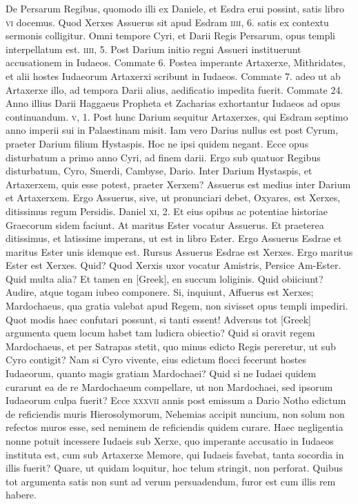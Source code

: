 De Persarum Regibus, quomodo illi ex Daniele,
 et Esdra erui possint,
satis libro \textsc{vi} docemus.
Quod Xerxes Assuerus sit apud Esdram
\textsc{iiii}, 6. satis ex contextu sermonis colligitur.
Omni tempore
Cyri, et Darii Regis Persarum, opus templi interpellatum est.
\textsc{iiii}, 5.
Post Darium initio regni Assueri instituerunt accusationem
in Iudaeos.
Commate 6.
Postea imperante Artaxerxe, Mithridates,
et alii hostes Iudaeorum Artaxerxi scribunt in Iudaeos.
Commate 7.
adeo ut ab Artaxerxe illo, ad tempora Darii alius, aedificatio impedita
fuerit.
Commate 24.
Anno illius Darii Haggaeus Propheta
et Zacharias exhortantur Iudaeos ad opus continuandum.
\textsc{v}, 1.
Post hunc Darium sequitur Artaxerxes, qui Esdram septimo anno
imperii sui in Palaestinam misit.
Iam vero Darius nullus est post Cyrum,
praeter Darium filium Hystaspis.
Hoc ne ipsi quidem negant.
Ecce opus disturbatum a primo anno Cyri, ad finem darii.
Ergo sub quatuor Regibus disturbatum, Cyro, Smerdi, Cambyse,
Dario.
Inter Darium Hystaspis, et Artaxerxem, quis esse potest,
praeter Xerxem?
Assuerus est medius inter Darium et Artaxerxem.
Ergo Assuerus, sive, ut pronunciari debet, Oxyares, est Xerxes, ditissimus
regum Persidis.
Daniel \textsc{xi}, 2.
Et eius opibus ac potentiae historiae
Graecorum sidem faciunt.
At maritus Ester vocatur Assuerus.
Et praeterea ditissimus, et latissime imperans, ut est in libro
Ester.
Ergo Assuerus Esdrae et maritus Ester unis idemque est.
Rursus Assuerus Esdrae est Xerxes.
Ergo maritus Ester est Xerxes.
Quid?
Quod Xerxis uxor vocatur Amistris, Persice Am-Ester.
Quid multa alia?
Et tamen en \textgreek{[Greek]}, en succum loliginis.
Quid obiiciunt?
Audire, atque togam iubeo componere.
Si, inquiunt, Affuerus est Xerxes;
Mardochaeus, qua gratia valebat apud Regem, non sivisset opus
templi impediri.
Quot modis haec confutari possunt, si tanti essent!
Adversus tot \textgreek{[Greek]} argumenta quem locum
 habet tam ludicra obiectio?
Quid si oravit regem Mardochaeus, et per Satrapas stetit, quo
minus edicto Regis pereretur, ut sub Cyro contigit?
Nam si Cyro vivente,
eius edictum flocci fecerunt hostes Iudaeorum, quanto magis
gratiam Mardochaei?
Quid si ne Iudaei quidem curarunt ea de re Mardochaeum
compellare, ut non Mardochaei, sed ipsorum Iudaeorum
culpa fuerit?
Ecce \textsc{xxxvii} annis post emissum a Dario Notho edictum
de reficiendis muris Hierosolymorum, Nehemias accipit nuncium,
non solum non refectos muros esse, sed neminem de reficiendis
quidem curare.
Haec negligentia nonne potuit incessere Iudaeis sub
Xerxe, quo imperante accusatio in Iudaeos instituta est, cum sub Artaxerxe
Memore, qui Iudaeis favebat, tanta socordia in illis fuerit?
Quare, ut quidam loquitur, hoc telum stringit, non perforat.
{}
Quibus tot argumenta satis non sunt ad verum persuadendum, furor est
cum illis rem habere.


